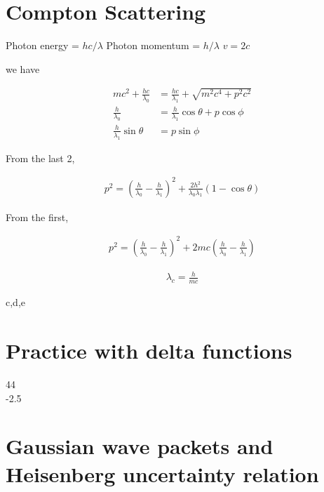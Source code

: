 \documentclass{article}
\title{}
\date{}
\newcommand{\<}{\langle}
\renewcommand{\>}{\rangle}
\begin{document}
\maketitle

\section{Compton Scattering}

Photon energy = $hc/\lambda$
Photon momentum = $h/\lambda$
$v = 2c$

we have

\begin{align*}
mc^2 + \frac{hc}{\lambda_0} &= \frac{hc}{\lambda_1} + \sqrt{m^2c^4 + p^2c^2} \\
\frac{h}{\lambda_0} &= \frac{h}{\lambda_1} \cos\theta + p\cos\phi \\
\frac{h}{\lambda_1} \sin\theta &= p\sin\phi
\end{align*}

From the last 2,

\begin{align*}
p^2 = \left(\frac{h}{\lambda_0} - \frac{h}{\lambda_1}\right)^2 + \frac{2h^2}{\lambda_0\lambda_1}(1-\cos\theta)
\end{align*}

From the first,

\begin{align*}
p^2 = \left(\frac{h}{\lambda_0} - \frac{h}{\lambda_1}\right)^2 + 2mc\left(\frac{h}{\lambda_0} - \frac{h}{\lambda_1}\right)
\end{align*}

\begin{align*}
\lambda_c = \frac{h}{mc}
\end{align*}

c,d,e

\section{Practice with delta functions}

44
\\
-2.5

\section{Gaussian wave packets and Heisenberg uncertainty relation}
\end{document}
